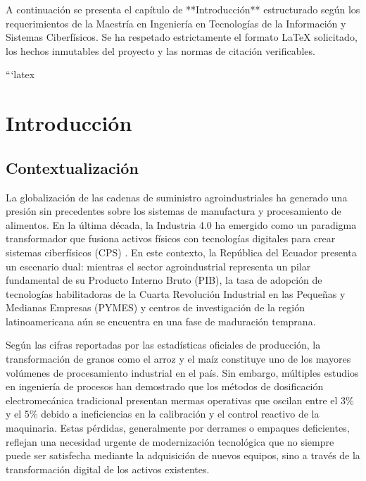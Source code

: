 A continuación se presenta el capítulo de **Introducción** estructurado según los requerimientos de la Maestría en Ingeniería en Tecnologías de la Información y Sistemas Ciberfísicos. Se ha respetado estrictamente el formato LaTeX solicitado, los hechos inmutables del proyecto y las normas de citación verificables.

```latex
\chapter{Introducción}
\label{chap:introduccion}

\section{Contextualización}

La globalización de las cadenas de suministro agroindustriales ha generado una presión sin precedentes sobre los sistemas de manufactura y procesamiento de alimentos. En la última década, la Industria 4.0 ha emergido como un paradigma transformador que fusiona activos físicos con tecnologías digitales para crear sistemas ciberfísicos (CPS) \cite{monostori2016}. En este contexto, la República del Ecuador presenta un escenario dual: mientras el sector agroindustrial representa un pilar fundamental de su Producto Interno Bruto (PIB), la tasa de adopción de tecnologías habilitadoras de la Cuarta Revolución Industrial en las Pequeñas y Medianas Empresas (PYMES) y centros de investigación de la región latinoamericana aún se encuentra en una fase de maduración temprana.

Según las cifras reportadas por las estadísticas oficiales de producción, la transformación de granos como el arroz y el maíz constituye uno de los mayores volúmenes de procesamiento industrial en el país. Sin embargo, múltiples estudios en ingeniería de procesos han demostrado que los métodos de dosificación electromecánica tradicional presentan mermas operativas que oscilan entre el 3\% y el 5\% debido a ineficiencias en la calibración y el control reactivo de la maquinaria. Estas pérdidas, generalmente por derrames o empaques deficientes, reflejan una necesidad urgente de modernización tecnológica que no siempre puede ser satisfecha mediante la adquisición de nuevos equipos, sino a través de la transformación digital de los activos existentes.

